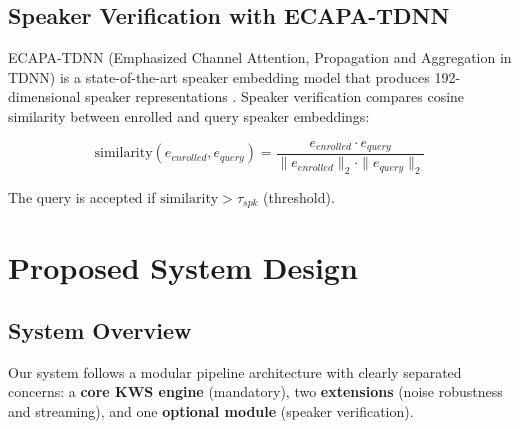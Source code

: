 \documentclass[12pt,a4paper]{report}
\begin{document}
\section{Speaker Verification with ECAPA-TDNN}

ECAPA-TDNN (Emphasized Channel Attention, Propagation and Aggregation in
TDNN) is a state-of-the-art speaker embedding model that produces 192-dimensional
speaker representations \cite{speechbrain}. Speaker verification compares
cosine similarity between enrolled and query speaker embeddings:

\begin{equation}
    \text{similarity}(e_{enrolled}, e_{query}) =
    \frac{e_{enrolled} \cdot e_{query}}
         {\|e_{enrolled}\|_2 \cdot \|e_{query}\|_2}
    \label{eq:cosine_sim}
\end{equation}

The query is accepted if $\text{similarity} > \tau_{spk}$ (threshold).


\chapter{Proposed System Design}

\section{System Overview}

Our system follows a modular pipeline architecture with clearly separated
concerns: a \textbf{core KWS engine} (mandatory), two \textbf{extensions}
(noise robustness and streaming), and one \textbf{optional module} (speaker
verification).
\end{document}
